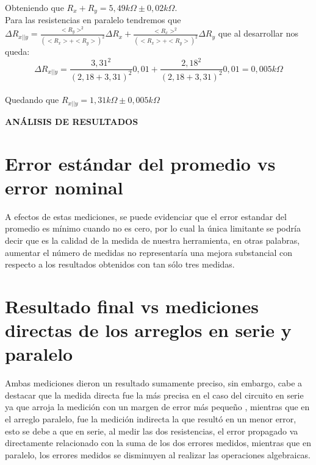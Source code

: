 \documentclass[12pt]{article}
\begin{document}
 	 \noindent Obteniendo que $R_x + R_y = 5,49k\Omega \pm 0,02k\Omega$.\\
 	 
 	 \noindent Para las resistencias en paralelo tendremos que $\Delta R_{x||y} = \frac{<R_y>^2}{(<R_x> + <R_y>)^2}\Delta R_x + \frac{<R_x>^2}{(<R_x> + <R_y>)^2}\Delta R_y$ que al desarrollar nos queda:\\
 	 
 	 \begin{equation}
 	 	\Delta R_{x||y} = \frac{3,31^2}{(2,18 + 3,31)^2}0,01 + \frac{2,18^2}{(2,18 + 3,31)^2}0,01 = 0,005k\Omega
 	 \end{equation}
 	 \\
 	 
 	 \noindent Quedando que $R_{x||y} = 1,31k\Omega \pm 0,005k\Omega$
 	 
 	 \newpage
 	 
 	 \begin{center}
 	 	\textbf{\large ANÁLISIS DE RESULTADOS}\\
 	 \end{center}
 	 
 	 \section*{Error estándar del promedio vs error nominal}
 	 
 	 \noindent A efectos de estas mediciones, se puede evidenciar que el error estandar del promedio es mínimo cuando no es cero, por lo cual la única limitante se podría decir que es la calidad de la medida de nuestra herramienta, en otras palabras, aumentar el número de medidas no representaría una mejora substancial con respecto a los resultados obtenidos con tan sólo tres medidas. \\
 	 
 	 \section*{Resultado final vs mediciones directas de los arreglos en serie y paralelo}
 	 
 	 \noindent Ambas mediciones dieron un resultado sumamente preciso, sin embargo, cabe a destacar que la medida directa fue la más precisa en el caso del circuito en serie ya que arroja la medición con un margen de error más pequeño , mientras que en el arreglo paralelo, fue la medición indirecta la que resultó en un menor error, esto se debe a que en serie,  al medir las dos resistencias, el error propagado va directamente relacionado con la suma de los dos errores medidos, mientras que en paralelo, los errores medidos se disminuyen al realizar las operaciones algebraicas.\\
 	 
\end{document}
